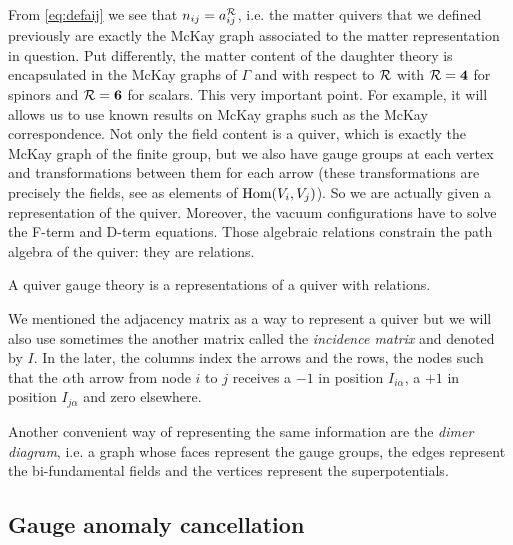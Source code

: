             From \eqref{eq:defaij} we see that $n_{ij}=a^{\mathcal{R}}_{ij}$, i.e. the matter quivers that we defined previously are exactly the McKay graph associated to the matter representation in question. Put differently, the matter content of the daughter theory is encapsulated in the McKay graphs of $\Gamma$ and with respect to $\mathcal{R}$ with $\mathcal{R}=\boldsymbol{4}$ for spinors and $\mathcal{R}=\boldsymbol{6}$ for scalars. This very important point. For example, it will allows us to use known results on McKay graphs such as the McKay correspondence. Not only the field content is a quiver, which is exactly the McKay graph of the finite group, but we also have gauge groups at each vertex and transformations between them for each arrow (these transformations are precisely the fields, see as elements of $\text{Hom}(V_i,V_j)$). So we are actually given a representation of the quiver. Moreover, the vacuum configurations have to solve the F-term and D-term equations. Those algebraic relations constrain the path algebra of the quiver: they are relations.
            \begin{result}
                A quiver gauge theory is a representations of a quiver with relations.
            \end{result}

            We mentioned the adjacency matrix as a way to represent a quiver but we will also use sometimes the another matrix called the \emph{incidence matrix} and denoted by $I$. In the later, the columns index the arrows and the rows, the nodes such that the $\alpha$th arrow from node $i$ to $j$ receives a $-1$ in position $I_{i\alpha}$, a $+1$ in position $I_{j\alpha}$ and zero elsewhere.

            Another convenient way of representing the same information are the \emph{dimer diagram}, i.e. a graph whose faces represent the gauge groups, the edges represent the bi-fundamental fields and the vertices represent the superpotentials.

    \subsection{Gauge anomaly cancellation}

